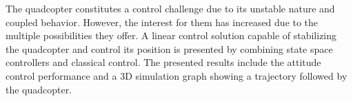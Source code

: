 

The quadcopter constitutes a control challenge due to its unstable nature and coupled behavior. However, the interest for them has increased due to the multiple possibilities they offer. A linear control solution capable of stabilizing the quadcopter and control its position is presented by combining state space controllers and classical control. The presented results include the attitude control performance and a 3D simulation graph showing a trajectory followed by the quadcopter.